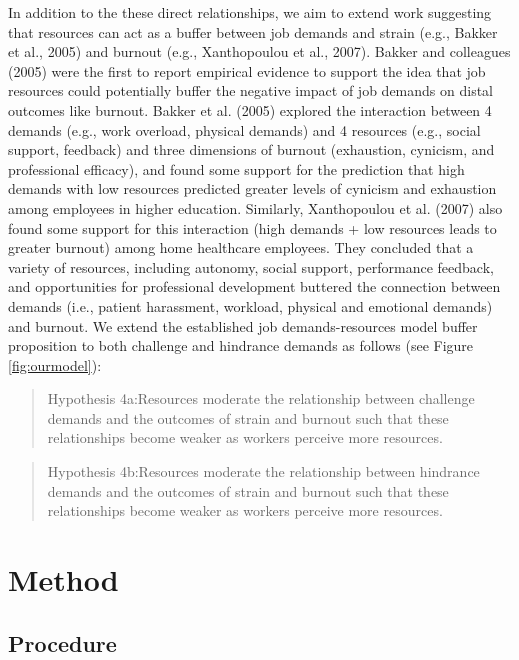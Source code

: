 \documentclass[
  man,mask]{apa7}
\begin{document}
In addition to the these direct relationships, we aim to extend work suggesting that resources can act as a buffer between job demands and strain (e.g., Bakker et al., 2005) and burnout (e.g., Xanthopoulou et al., 2007). Bakker and colleagues (2005) were the first to report empirical evidence to support the idea that job resources could potentially buffer the negative impact of job demands on distal outcomes like burnout. Bakker et al. (2005) explored the interaction between 4 demands (e.g., work overload, physical demands) and 4 resources (e.g., social support, feedback) and three dimensions of burnout (exhaustion, cynicism, and professional efficacy), and found some support for the prediction that high demands with low resources predicted greater levels of cynicism and exhaustion among employees in higher education. Similarly, Xanthopoulou et al. (2007) also found some support for this interaction (high demands + low resources leads to greater burnout) among home healthcare employees. They concluded that a variety of resources, including autonomy, social support, performance feedback, and opportunities for professional development buttered the connection between demands (i.e., patient harassment, workload, physical and emotional demands) and burnout. We extend the established job demands-resources model buffer proposition to both challenge and hindrance demands as follows (see Figure \ref{fig:ourmodel}):

\begin{quote}
Hypothesis 4a:Resources moderate the relationship between challenge demands and the outcomes of strain and burnout such that these relationships become weaker as workers perceive more resources.
\end{quote}

\begin{quote}
Hypothesis 4b:Resources moderate the relationship between hindrance demands and the outcomes of strain and burnout such that these relationships become weaker as workers perceive more resources.
\end{quote}

\hypertarget{method}{%
\section{Method}\label{method}}

\hypertarget{procedure}{%
\subsection{Procedure}\label{procedure}}
\end{document}
